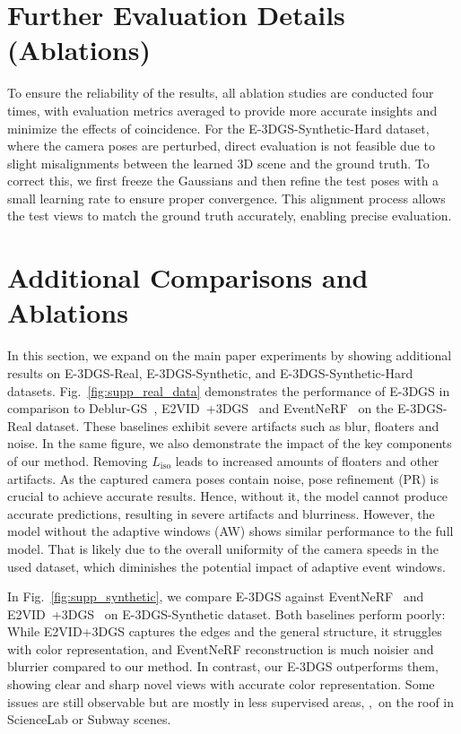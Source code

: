 



\section{Further Evaluation Details (Ablations)}
\label{sec:supp_evaluation}

To ensure the reliability of the results, all ablation studies are conducted four times, with evaluation metrics averaged to provide more accurate insights and minimize the effects of coincidence. 
For the E-3DGS-Synthetic-Hard dataset, where the camera poses are perturbed, direct evaluation is not feasible due to slight misalignments between the learned 3D scene and the ground truth. 
To correct this, we first freeze the Gaussians and then refine the test poses with a small learning rate to ensure proper convergence. 
This alignment process allows the test views to match the ground truth accurately, enabling precise evaluation. 

\section{Additional Comparisons and Ablations}
\label{sec:additional_comparisons}

In this section, we expand on the main paper experiments by showing additional results on E-3DGS-Real, E-3DGS-Synthetic, and E-3DGS-Synthetic-Hard datasets.
Fig.~\ref{fig:supp_real_data} demonstrates the performance of E-3DGS in comparison to Deblur-GS~\cite{deblurgs}, E2VID~\cite{e2vid}+3DGS~\cite{3dgs} and EventNeRF~\cite{eventnerf} on the E-3DGS-Real dataset.
These baselines exhibit severe artifacts such as blur, floaters and noise.
In the same figure, we also demonstrate the impact of the key components of our method.
Removing $L_\text{iso}$ leads to increased amounts of floaters and other artifacts.
As the captured camera poses contain noise, pose refinement (PR) is crucial to achieve accurate results.
Hence, without it, the model cannot produce accurate predictions, resulting in severe artifacts and blurriness.
However, the model without the adaptive windows (AW) shows similar performance to the full model.
That is likely due to the overall uniformity of the camera speeds in the used dataset, which diminishes the potential impact of adaptive event windows.


In Fig.~\ref{fig:supp_synthetic}, we compare E-3DGS against EventNeRF~\cite{eventnerf} and E2VID~\cite{e2vid}+3DGS~\cite{3dgs} on E-3DGS-Synthetic dataset.
Both baselines perform poorly: While E2VID+3DGS captures the edges and the general structure, it struggles with color representation, and EventNeRF reconstruction is much noisier and blurrier compared to our method.
In contrast, our E-3DGS outperforms them, showing clear and sharp novel views with accurate color representation.
Some issues are still observable but are mostly in less supervised areas, \eg,~on the roof in ScienceLab or Subway scenes.


